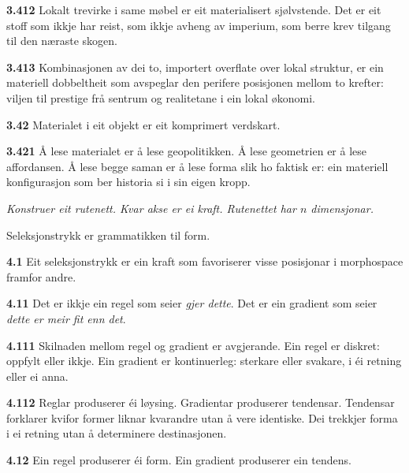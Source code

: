 \documentclass[11pt, a4paper]{article}
\newcommand{\prop}[1]{\bigskip\noindent{\Large\textbf{\textcolor{propcolor}{#1}}}\quad}
\newcommand{\subprop}[1]{\medskip\noindent\textbf{#1}\quad}
\begin{document}
\subprop{3.412} Lokalt trevirke i same m\o bel er eit materialisert sj\o lvstende. Det er eit stoff som ikkje har reist, som ikkje avheng av imperium, som berre krev tilgang til den n\ae raste skogen.

\subprop{3.413} Kombinasjonen av dei to, importert overflate over lokal struktur, er ein materiell dobbeltheit som avspeglar den perifere posisjonen mellom to krefter: viljen til prestige fr\aa{} sentrum og realitetane i ein lokal \o konomi.

\subprop{3.42} Materialet i eit objekt er eit komprimert verdskart.

\subprop{3.421} \AA{} lese materialet er \aa{} lese geopolitikken. \AA{} lese geometrien er \aa{} lese affordansen. \AA{} lese begge saman er \aa{} lese forma slik ho faktisk er: ein materiell konfigurasjon som ber historia si i sin eigen kropp.



\vspace{1.5em}
\begin{center}
\emph{Konstruer eit rutenett. Kvar akse er ei kraft. Rutenettet har $n$ dimensjonar.}
\end{center}
\vspace{1.5em}



\prop{4} Seleksjonstrykk er grammatikken til form.

\subprop{4.1} Eit seleksjonstrykk er ein kraft som favoriserer visse posisjonar i morphospace framfor andre.

\subprop{4.11} Det er ikkje ein regel som seier \emph{gjer dette}. Det er ein gradient som seier \emph{dette er meir fit enn det}.

\subprop{4.111} Skilnaden mellom regel og gradient er avgjerande. Ein regel er diskret: oppfylt eller ikkje. Ein gradient er kontinuerleg: sterkare eller svakare, i \'ei retning eller ei anna.

\subprop{4.112} Reglar produserer \'ei l\o ysing. Gradientar produserer tendensar. Tendensar forklarer kvifor former liknar kvarandre utan \aa{} vere identiske. Dei trekkjer forma i ei retning utan \aa{} determinere destinasjonen.

\subprop{4.12} Ein regel produserer \'ei form. Ein gradient produserer ein tendens.
\end{document}
